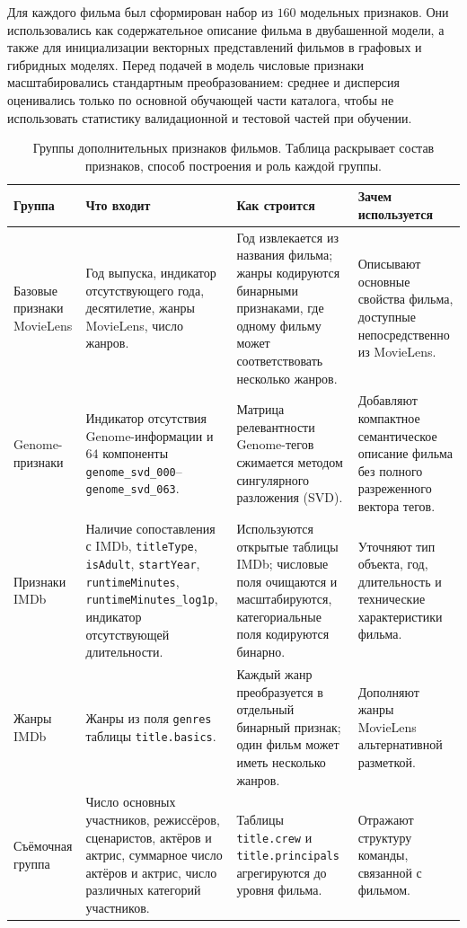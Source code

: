 \documentclass[12pt,fleqn]{article}
\begin{document}
Для каждого фильма был сформирован набор из $160$ модельных признаков. Они
использовались как содержательное описание фильма в двубашенной модели, а также
для инициализации векторных представлений фильмов в графовых и гибридных
моделях. Перед подачей в модель числовые признаки масштабировались стандартным
преобразованием: среднее и дисперсия оценивались только по основной обучающей
части каталога, чтобы не использовать статистику валидационной и тестовой частей при обучении.

\begin{table}[H]
\centering
\scriptsize
\renewcommand{\arraystretch}{1.18}
\caption{Группы дополнительных признаков фильмов. Таблица раскрывает состав признаков, способ построения и роль каждой группы.}
\label{tab:appendix_feature_groups}
\begin{tabular}{p{}p{}p{}p{}}
\toprule
Группа & Что входит & Как строится & Зачем используется \\
\midrule
Базовые признаки MovieLens & Год выпуска, индикатор отсутствующего года, десятилетие, жанры MovieLens, число жанров. & Год извлекается из названия фильма; жанры кодируются бинарными признаками, где одному фильму может соответствовать несколько жанров. & Описывают основные свойства фильма, доступные непосредственно из MovieLens. \\
\addlinespace
Genome-признаки & Индикатор отсутствия Genome-информации и $64$ компоненты \texttt{genome\_svd\_000}--\texttt{genome\_svd\_063}. & Матрица релевантности Genome-тегов сжимается методом сингулярного разложения (SVD). & Добавляют компактное семантическое описание фильма без полного разреженного вектора тегов. \\
\addlinespace
Признаки IMDb & Наличие сопоставления с IMDb, \texttt{titleType}, \texttt{isAdult}, \texttt{startYear}, \texttt{runtimeMinutes}, \texttt{runtimeMinutes\_log1p}, индикатор отсутствующей длительности. & Используются открытые таблицы IMDb; числовые поля очищаются и масштабируются, категориальные поля кодируются бинарно. & Уточняют тип объекта, год, длительность и технические характеристики фильма. \\
\addlinespace
Жанры IMDb & Жанры из поля \texttt{genres} таблицы \texttt{title.basics}. & Каждый жанр преобразуется в отдельный бинарный признак; один фильм может иметь несколько жанров. & Дополняют жанры MovieLens альтернативной разметкой. \\
\addlinespace
Съёмочная группа & Число основных участников, режиссёров, сценаристов, актёров и актрис, суммарное число актёров и актрис, число различных категорий участников. & Таблицы \texttt{title.crew} и \texttt{title.principals} агрегируются до уровня фильма. & Отражают структуру команды, связанной с фильмом. \\

\end{tabular}
\end{table}
\end{document}
